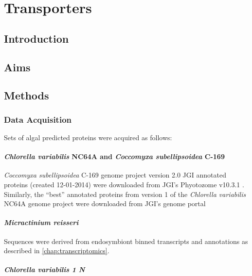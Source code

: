 \graphicspath{{chapters/5.Chapter_3/figures}}

\chapter{Transporters}

\section{Introduction}

\section{Aims}

\section{Methods}

\subsection{Data Acquisition}

Sets of algal predicted proteins were acquired as follows:

\subsubsection{\textit{Chlorella variabilis} NC64A and \textit{Coccomyxa subellipsoidea} C-169} 
 
\textit{Coccomyxa subellipsoidea} C-169 genome project \citep{Blanc2012} version 2.0 
JGI annotated proteins (created 12-01-2014) were downloaded from JGI's
Phyotozome v10.3.1 \citep{Goodstein2012}. 
Similarly, the ``best'' annotated proteins from
version 1 of the \textit{Chlorella variabilis} NC64A genome project \citep{Blanc2010}
were downloaded from JGI's genome portal \citep{Grigoriev2011,Nordberg2014}

\subsubsection{\textit{Micractinium reisseri}}

Sequences were derived from endosymbiont binned
transcripts and annotations as described in \ref{chap:transcriptomics}.

\subsubsection{\textit{Chlorella variabilis 1 N}}

